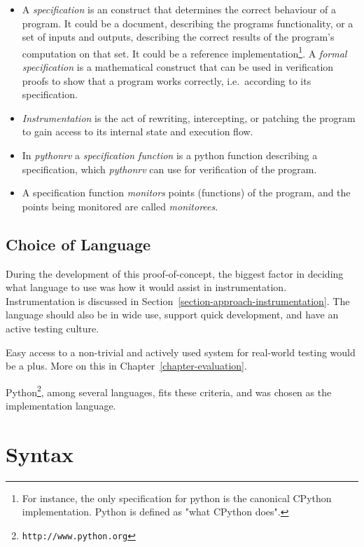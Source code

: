 \documentclass[a4paper,11pt]{kth-mag}
\begin{document}
\begin{itemize}
	\item A \textit{specification} is an construct that determines the correct
		behaviour of a program. It could be a document, describing the programs
		functionality, or a set of inputs and outputs, describing the correct
		results of the program's computation on that set. It could be a reference
		implementation\footnote{For instance, the only specification for python is
		the canonical CPython implementation. Python is defined as "what CPython
		does".}. A \textit{formal specification} is a mathematical construct that
		can be used in verification proofs to show that a program works correctly,
		i.e.\ according to its specification.

	\item \textit{Instrumentation} is the act of rewriting, intercepting, or
		patching the program to gain access to its internal state and execution
		flow.

	\item In \textit{pythonrv} a \textit{specification function} is a python
		function describing a specification, which \textit{pythonrv} can use for
		verification of the program.

	\item A specification function
		\textit{monitors} points (functions) of the program, and the points being
		monitored are called \textit{monitorees}.
\end{itemize}

\subsection{Choice of Language}

During the development of this proof-of-concept, the biggest factor in deciding
what language to use was how it would assist in instrumentation.
Instrumentation is discussed in Section~\ref{section-approach-instrumentation}.
The language should also be in wide use, support quick development, and have an
active testing culture.

Easy access to a non-trivial and actively used system for real-world testing
would be a plus. More on this in Chapter~\ref{chapter-evaluation}.

Python\footnote{\texttt{http://www.python.org}}, among several languages, fits
these criteria, and was chosen as the implementation language.

\section{Syntax} \label{section-approach-syntax}
\end{document}
